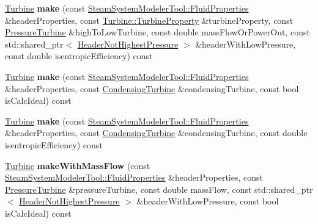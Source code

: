 \begin{DoxyCompactItemize}
\item 
\mbox{\label{class_turbine_factory_ab14f6bfd1b6202e9cf45d9d023f78f77}} 
\hyperlink{class_turbine}{Turbine} {\bfseries make} (const \hyperlink{struct_steam_system_modeler_tool_1_1_fluid_properties}{Steam\+System\+Modeler\+Tool\+::\+Fluid\+Properties} \&header\+Properties, const \hyperlink{class_turbine_a5db4f65cf2539e3837684d53221ade12}{Turbine\+::\+Turbine\+Property} \&turbine\+Property, const \hyperlink{class_pressure_turbine}{Pressure\+Turbine} \&high\+To\+Low\+Turbine, const double mass\+Flow\+Or\+Power\+Out, const std\+::shared\+\_\+ptr$<$ \hyperlink{class_header_not_highest_pressure}{Header\+Not\+Highest\+Pressure} $>$ \&header\+With\+Low\+Pressure, const double isentropic\+Efficiency) const
\item 
\mbox{\label{class_turbine_factory_a7a7ed3809be731fa9768fbed3f03f869}} 
\hyperlink{class_turbine}{Turbine} {\bfseries make} (const \hyperlink{struct_steam_system_modeler_tool_1_1_fluid_properties}{Steam\+System\+Modeler\+Tool\+::\+Fluid\+Properties} \&header\+Properties, const \hyperlink{class_condensing_turbine}{Condensing\+Turbine} \&condensing\+Turbine, const bool is\+Calc\+Ideal) const
\item 
\mbox{\label{class_turbine_factory_abfdd2414b20185135168f89ec0bccc9f}} 
\hyperlink{class_turbine}{Turbine} {\bfseries make} (const \hyperlink{struct_steam_system_modeler_tool_1_1_fluid_properties}{Steam\+System\+Modeler\+Tool\+::\+Fluid\+Properties} \&header\+Properties, const \hyperlink{class_condensing_turbine}{Condensing\+Turbine} \&condensing\+Turbine, const double isentropic\+Efficiency) const
\item 
\mbox{\label{class_turbine_factory_ab589b4af489fc3baa773d76d83f7417f}} 
\hyperlink{class_turbine}{Turbine} {\bfseries make\+With\+Mass\+Flow} (const \hyperlink{struct_steam_system_modeler_tool_1_1_fluid_properties}{Steam\+System\+Modeler\+Tool\+::\+Fluid\+Properties} \&header\+Properties, const \hyperlink{class_pressure_turbine}{Pressure\+Turbine} \&pressure\+Turbine, const double mass\+Flow, const std\+::shared\+\_\+ptr$<$ \hyperlink{class_header_not_highest_pressure}{Header\+Not\+Highest\+Pressure} $>$ \&header\+With\+Low\+Pressure, const bool is\+Calc\+Ideal) const
\item 
\mbox{\label{class_turbine_factory_af766c15c9b773bba15d516c4492cd804}} 

\end{DoxyCompactItemize}
